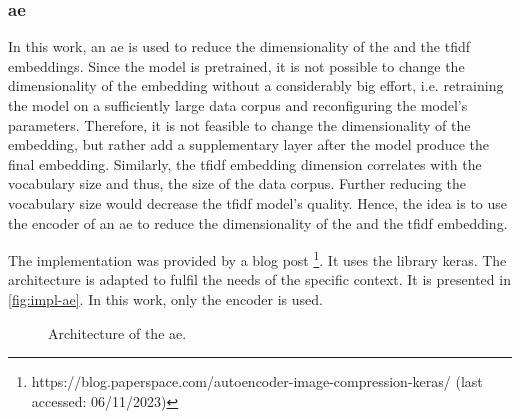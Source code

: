 \subsubsection*{\acl{ae}}\label{subsubsec:impl-autoencoder}

In this work, an \ac{ae} is used to reduce the dimensionality of the \infersent{} and the \ac{tfidf} embeddings.
Since the \infersent{} model is pretrained, it is not possible to change the dimensionality of the embedding without a considerably big effort,
i.e. retraining the model on a sufficiently large data corpus and reconfiguring the model's parameters.
Therefore, it is not feasible to change the dimensionality of the \infersent{} embedding, but rather add a supplementary layer after the model 
produce the final embedding.
Similarly, the \ac{tfidf} embedding dimension correlates with the vocabulary size and thus, the size of the data corpus.
Further reducing the vocabulary size would decrease the \ac{tfidf} model's quality.
Hence, the idea is to use the encoder of an \ac{ae} to reduce the dimensionality of the \infersent{} and the \ac{tfidf} embedding.

The implementation was provided by a blog post
\footnote{https://blog.paperspace.com/autoencoder-image-compression-keras/ (last accessed: 06/11/2023)}.
It uses the library keras.
The architecture is adapted to fulfil the needs of the specific context.
It is presented in \autoref{fig:impl-ae}.
In this work, only the encoder is used.
%     

\begin{figure}[!htb] %
    \centering
    
    \caption[Architecture of the \ac{ae}]{Architecture of the \ac{ae}.}
    \label{fig:impl-ae}
\end{figure}